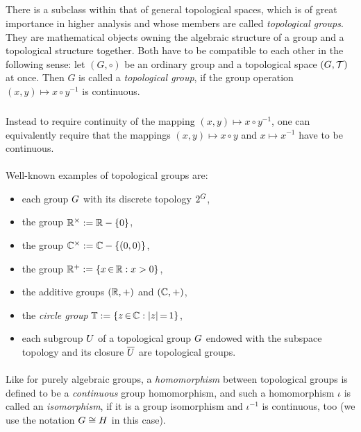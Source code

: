 \documentclass[11pt,twoside]{article}
\begin{document}
\subparagraph{} %
There is a subclass within that of general topological spaces,
which is of great importance in higher analysis
and whose members are called \textit{topological groups}.
They are mathematical objects owning the algebraic structure of a group
and a topological structure together.
Both have to be compatible to each other in the following sense:
let $(G,\circ)$ be an ordinary group and a topological space $(G,\mathcal{T})$
at once.
Then $G$ is called a \textit{topological group},
if the group operation $(x,y) \mapsto x \circ y^{-1}$ is continuous.

\subparagraph{}
Instead to require continuity of the mapping $(x,y) \mapsto x \circ y^{-1}$,
one can equivalently require
that the mappings $(x,y) \mapsto x \circ y$ and $x \mapsto x^{-1}$
have to be continuous.

\paragraph{} %
Well-known examples of topological groups are:

\begin{itemize}[leftmargin=12pt]
\item[1.]
each group $G$ with its discrete topology $2^{G}$,

\item[2.]
the group ${\mathbb{R}}^{\times} := {\mathbb{R}} - \{0\}$,

\item[3.]
the group ${\mathbb{C}}^{\times} := {\mathbb{C}} - \{(0,0)\}$,

\item[4.]
the group ${\mathbb{R}}^+ := \{x {\,\in\,} {\mathbb{R}}: x >0\}$,

\item[5.]
the additive groups $({\mathbb{R}},+)$ and $({\mathbb{C}},+)$,

\item[6.]
the \textit{circle group} $\mathbb{T} := \{z \xeof \C: \abs{z} \eq 1 \}$,

\item[7.]
each subgroup $U$ of a topological group $G$
endowed with the subspace topology
and its closure $\overline{U}$ are topological groups.
\end{itemize}

\paragraph{}
Like for purely algebraic groups,
a \textit{homomorphism} between topological groups
is defined to be a \textit{continuous} group homomorphism,
and such a homomorphism $\iota$ is called an \textit{isomorphism},
if it is a group isomorphism and $\iota^{-1}$ is continuous,
too
(we use the notation $G \cong H$ in this case).
\end{document}
